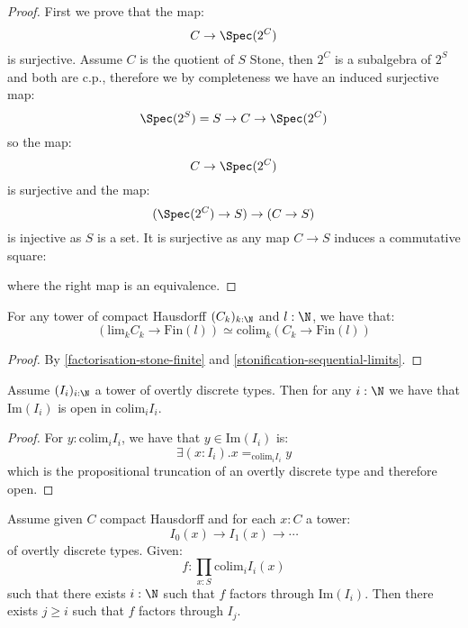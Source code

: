 \begin{proof}
First we prove that the map:
\[C\to \Spec(2^C)\]
is surjective. Assume $C$ is the quotient of $S$ Stone, then $2^C$ is a subalgebra of $2^S$ and both are c.p., therefore we by completeness we have an induced surjective map:
\[\Spec(2^S) = S\to C\to \Spec(2^C)\]
so the map:
\[C\to \Spec(2^C)\]
is surjective and the map:
\[(\Spec(2^C) \to S) \to (C\to S) \]
is injective as $S$ is a set. It is surjective as any map $C\to S$ induces a commutative square:
\begin{center}
\end{center}
where the right map is an equivalence.
\end{proof}

\begin{lemma}\label{factorisation-compact-hausdorff-finite}
For any tower of compact Hausdorff $(C_k)_{k:\N}$ and $l:\N$, we have that:
\[\left(\mathrm{lim}_kC_k\to \mathrm{Fin}(l)\right) \simeq \mathrm{colim}_k (C_k\to \mathrm{Fin}(l))\]
\end{lemma}

\begin{proof}
By \cref{factorisation-stone-finite} and \cref{stonification-sequential-limits}.
\end{proof}

\begin{lemma}\label{overtly-discrete-union-open}
Assume $(I_i)_{i:\N}$ a tower of overtly discrete types. Then for any $i:\N$ we have that $\mathrm{Im}(I_i)$ is open in $\mathrm{colim}_i I_i$. 
\end{lemma}

\begin{proof}
For $y:\mathrm{colim}_iI_i$, we have that $y\in \mathrm{Im}(I_i)$ is:
\[\exists(x:I_i). x=_{\mathrm{colim}_iI_i}y\]
which is the propositional truncation of an overtly discrete type and therefore open.
\end{proof}

\begin{lemma}\label{factorisation-image-true-factorisation}
Assume given $C$ compact Hausdorff and for each $x:C$ a tower:
\[I_0(x)\to I_1(x)\to \cdots\]
of overtly discrete types. Given:
\[f:\prod_{x:S}\mathrm{colim}_i I_i(x)\]
such that there exists $i:\N$ such that $f$ factors through $\mathrm{Im}(I_i)$. Then there exists $j\geq i$ such that $f$ factors through $I_j$.
\end{lemma}

